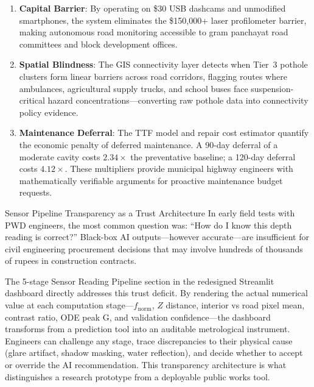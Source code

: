 \begin{enumerate}
    \item \textbf{Capital Barrier}: By operating on \$30 USB dashcams and unmodified smartphones, the system eliminates the \$150,000+ laser profilometer barrier, making autonomous road monitoring accessible to gram panchayat road committees and block development offices.

    \item \textbf{Spatial Blindness}: The GIS connectivity layer detects when Tier~3 pothole clusters form linear barriers across road corridors, flagging routes where ambulances, agricultural supply trucks, and school buses face suspension-critical hazard concentrations---converting raw pothole data into connectivity policy evidence.

    \item \textbf{Maintenance Deferral}: The TTF model and repair cost estimator quantify the economic penalty of deferred maintenance. A 90-day deferral of a moderate cavity costs $2.34\times$ the preventative baseline; a 120-day deferral costs $4.12\times$. These multipliers provide municipal highway engineers with mathematically verifiable arguments for proactive maintenance budget requests.
\end{enumerate}

\begin{designreflection}{Sensor Pipeline Transparency as a Trust Architecture}
In early field tests with PWD engineers, the most common question was: ``How do I know this depth reading is correct?'' Black-box AI outputs---however accurate---are insufficient for civil engineering procurement decisions that may involve hundreds of thousands of rupees in construction contracts.

The 5-stage Sensor Reading Pipeline section in the redesigned Streamlit dashboard directly addresses this trust deficit. By rendering the actual numerical value at each computation stage---$f_{\text{norm}}$, $Z$ distance, interior vs road pixel mean, contrast ratio, ODE peak G, and validation confidence---the dashboard transforms from a prediction tool into an auditable metrological instrument. Engineers can challenge any stage, trace discrepancies to their physical cause (glare artifact, shadow masking, water reflection), and decide whether to accept or override the AI recommendation. This transparency architecture is what distinguishes a research prototype from a deployable public works tool.
\end{designreflection}

